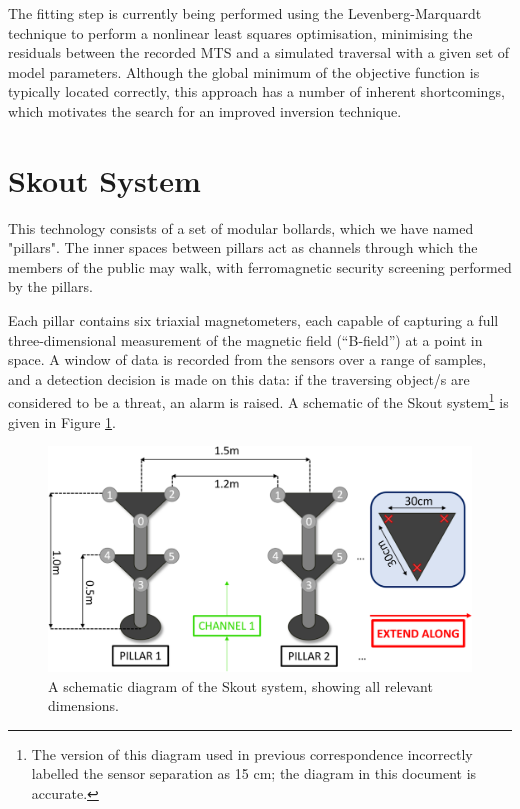 \documentclass[10pt, a4paper, twocolumn]{article} %
\begin{document}
The fitting step is currently being performed using the Levenberg-Marquardt technique to perform a nonlinear least squares optimisation, minimising the residuals between the recorded MTS and a simulated traversal with a given set of model parameters. Although the global minimum of the objective function is typically located correctly, this approach has a number of inherent shortcomings, which motivates the search for an improved inversion technique.



\section{Skout System}

This technology consists of a set of modular bollards, which we have named "pillars". The inner spaces between pillars act as channels through which the members of the public may walk, with ferromagnetic security screening performed by the pillars.

Each pillar contains six triaxial magnetometers, each capable of capturing a full three-dimensional measurement of the magnetic field (“B-field”) at a point in space. A window of data is recorded from the sensors over a range of samples, and a detection decision is made on this data: if the traversing object/s are considered to be a threat, an alarm is raised. A schematic of the Skout system\footnote{The version of this diagram used in previous correspondence incorrectly labelled the sensor separation as 15 cm; the diagram in this document is accurate.} is given in Figure \ref{Skout_schematic}.

\begin{figure}
	\includegraphics[width=\linewidth]{Figures/Fixed_Skout_Schematic.png} %
	\caption{A schematic diagram of the Skout system, showing all relevant dimensions.}
	\label{Skout_schematic}
\end{figure}
\end{document}
